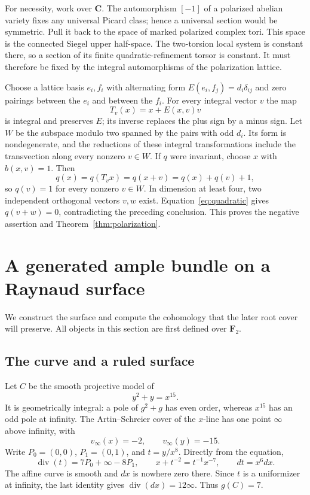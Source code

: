 \documentclass[11pt]{article}
\theoremstyle{remark}\newtheorem{remark}[theorem]{Remark}
\newcommand{\F}{\mathbf F}
\begin{document}
For necessity, work over $\mathbf C$. The automorphism $[-1]$ of a polarized abelian variety fixes any universal Picard class; hence a universal section would be symmetric. Pull it back to the space of marked polarized complex tori. This space is the connected Siegel upper half-space. The two-torsion local system is constant there, so a section of its finite quadratic-refinement torsor is constant. It must therefore be fixed by the integral automorphisms of the polarization lattice.

Choose a lattice basis $e_i,f_i$ with alternating form $E(e_i,f_j)=d_i\delta_{ij}$ and zero pairings between the $e_i$ and between the $f_i$. For every integral vector $v$ the map
\[
 T_v(x)=x+E(x,v)v
\]
is integral and preserves $E$; its inverse replaces the plus sign by a minus sign. Let $W$ be the subspace modulo two spanned by the pairs with odd $d_i$. Its form is nondegenerate, and the reductions of these integral transformations include the transvection along every nonzero $v\in W$. If $q$ were invariant, choose $x$ with $b(x,v)=1$. Then
\[
 q(x)=q(T_vx)=q(x+v)=q(x)+q(v)+1,
\]
so $q(v)=1$ for every nonzero $v\in W$. In dimension at least four, two independent orthogonal vectors $v,w$ exist. Equation~\eqref{eq:quadratic} gives $q(v+w)=0$, contradicting the preceding conclusion. This proves the negative assertion and Theorem~\ref{thm:polarization}.





\section{A generated ample bundle on a Raynaud surface}

We construct the surface and compute the cohomology that the later root cover will preserve. All objects in this section are first defined over $\F_2$.

\subsection{The curve and a ruled surface}

Let $C$ be the smooth projective model of
\[
 y^2+y=x^{15}.
\]
It is geometrically integral: a pole of $g^2+g$ has even order, whereas $x^{15}$ has an odd pole at infinity. The Artin--Schreier cover of the $x$-line has one point $\infty$ above infinity, with
\[
 v_\infty(x)=-2,\qquad v_\infty(y)=-15.
\]
Write $P_0=(0,0)$, $P_1=(0,1)$, and $t=y/x^8$. Directly from the equation,
\begin{equation}\label{eq:curve}
 \operatorname{div}(t)=7P_0+\infty-8P_1,
 \qquad x+t^{-2}=t^{-1}x^{-7},\qquad dt=x^6dx.
\end{equation}
The affine curve is smooth and $dx$ is nowhere zero there. Since $t$ is a uniformizer at infinity, the last identity gives $\operatorname{div}(dx)=12\infty$. Thus $g(C)=7$.
\end{document}
